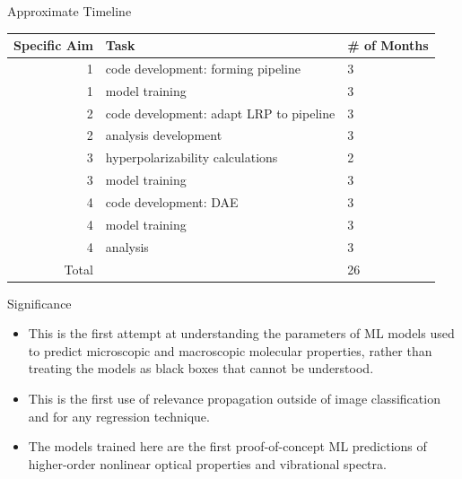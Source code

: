 \documentclass[xetex,compress]{beamer}
\begin{document}
\begin{frame}{Approximate Timeline}
\begin{table}[]
\centering
\begin{tabular}{@{}rp{}l@{}}
\toprule
Specific Aim & Task                                    & \# of Months \\ \midrule
1            & code development: forming pipeline      & 3            \\
1            & model training                          & 3            \\
2            & code development: adapt LRP to pipeline & 3            \\
2            & analysis development                    & 3            \\
3            & hyperpolarizability calculations        & 2            \\
3            & model training                          & 3            \\
4            & code development: DAE                   & 3            \\
4            & model training                          & 3            \\
4            & analysis                                & 3            \\ \midrule
Total        &                                         & 26           \\ \bottomrule
\end{tabular}
\end{table}\end{frame}

\begin{frame}{Significance}
  \begin{itemize}
  \item This is the first attempt at understanding the parameters of ML models used to predict microscopic and macroscopic molecular properties, rather than treating the models as black boxes that cannot be understood.
  \item This is the first use of relevance propagation outside of image classification and for any regression technique.
  \item The models trained here are the first proof-of-concept ML predictions of higher-order nonlinear optical properties and vibrational spectra.
  \end{itemize}
\end{frame}
\end{document}
